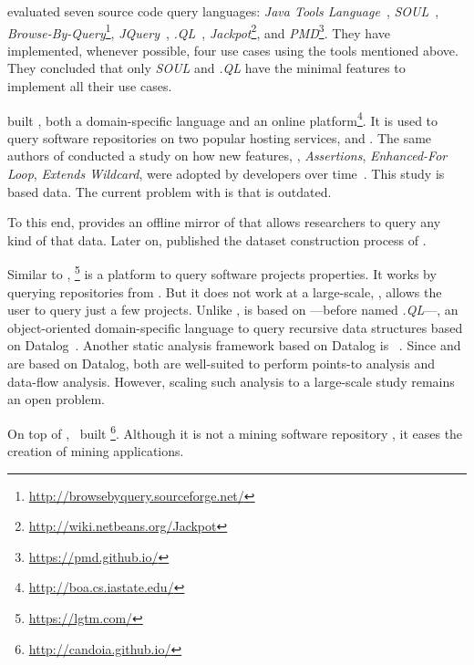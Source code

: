 \cite{urmaProgrammingLanguageEvolution2012} evaluated seven source code
query languages:
\emph{Java Tools Language}~\citep{cohenJTLJavaTools},
\emph{SOUL}~\citep{derooverSOULToolSuite2011},
\emph{Browse-By-Query}\footnote{\url{http://browsebyquery.sourceforge.net/}},
\emph{JQuery}~\citep{volderJqueryGenericCode2006},
\emph{.QL}~\citep{moorKeynoteAddressQL2007},
\emph{Jackpot}\footnote{\url{http://wiki.netbeans.org/Jackpot}}, and
\emph{PMD}\footnote{\url{https://pmd.github.io/}}.
They have implemented, whenever possible,
four use cases using the tools mentioned above.
They concluded that only \emph{SOUL} and \emph{.QL} have the minimal features to implement all their use cases.

\cite{dyerBoaLanguageInfrastructure2013,dyerDeclarativeVisitorsEase2013} built \boa{}, both a domain-specific language and an online platform\footnote{\url{http://boa.cs.iastate.edu/}}. 
It is used to query software repositories on two popular hosting services, \github{} and \sourceforge{}.
The same authors of \boa{} conducted a study on
how new \java{} features, \eg,
\emph{Assertions},
\emph{Enhanced-For Loop},
\emph{Extends Wildcard},
were adopted by developers over time~\citep{dyerMiningBillionsAST2014}.
This study is based \sourceforge{} data.
The current problem with \sourceforge{} is that is outdated.

To this end, \cite{gousiosGHTorentDatasetTool2013} provides an offline mirror of \github{} that allows researchers to query any kind of that data.
Later on, \cite{gousiosLeanGHTorrentGitHub2014} published the dataset construction process of \github{}.

Similar to \boa{}, \lgtm{}\footnote{\url{https://lgtm.com/}} is a platform to query software projects properties.
It works by querying repositories from \github{}.
But it does not work at a large-scale, \ie{}, \lgtm{} allows the user to query just a few projects.
Unlike \boa{}, \lgtm{} is based on \ql{}---before named \emph{.QL}---,
an object-oriented domain-specific language to query recursive data structures based on Datalog~\citep{avgustinovQLObjectorientedQueries2016}.
Another static analysis framework based on Datalog is \doop{}~\citep{bravenboerStrictlyDeclarativeSpecification}.
Since \ql{} and \doop{} are based on Datalog,
both are well-suited to perform points-to analysis and data-flow analysis.
However, scaling such analysis to a large-scale study remains an open problem.

On top of \boa{},~\cite{tiwariCandoiaPlatformBuilding2017} built \candoia{}%
\footnote{\url{http://candoia.github.io/}}.
Although it is not a mining software repository \perse{},
it eases the creation of mining applications. 

